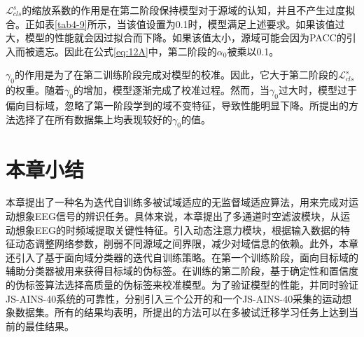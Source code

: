 $\mathcal{L}_{c l s}^{s}$的缩放系数的作用是在第二阶段保持模型对于源域的认知，并且不产生过度拟合。正如表\ref{tab4-9}所示，当该值设置为0.1时，模型满足上述要求。如果该值过大，模型的性能就会因过拟合而下降。如果该值太小，源域可能会因为PACC的引入而被遗忘。因此在公式\ref{eq:12A}中，第二阶段的$\alpha_0$被乘以0.1。

$\gamma_{0}$的作用是为了在第二训练阶段完成对模型的校准。因此，它大于第二阶段的$\mathcal{L}_{c l s}^{s}$的权重。随着$\gamma_{0}$的增加，模型逐渐完成了校准过程。然而，当$\gamma_{0}$过大时，模型过于偏向目标域，忽略了第一阶段学到的域不变特征，导致性能明显下降。所提出的方法选择了在所有数据集上均表现较好的$\gamma_{0}$的值。










\section{本章小结}

本章提出了一种名为迭代自训练多被试域适应的无监督域适应算法，用来完成对运动想象EEG信号的辨识任务。具体来说，本章提出了多通道时空滤波模块，从运动想象EEG的时频域提取关键性特征。引入动态注意力模块，根据输入数据的特征动态调整网络参数，削弱不同源域之间界限，减少对域信息的依赖。此外，本章还引入了基于面向域分类器的迭代自训练策略。在第一个训练阶段，面向目标域的辅助分类器被用来获得目标域的伪标签。在训练的第二阶段，基于确定性和置信度的伪标签算法选择高质量的伪标签来校准模型。为了验证模型的性能，并同时验证JS-AINS-40系统的可靠性，分别引入三个公开的和一个JS-AINS-40采集的运动想象数据集。所有的结果均表明，所提出的方法可以在多被试迁移学习任务上达到当前的最佳结果。


